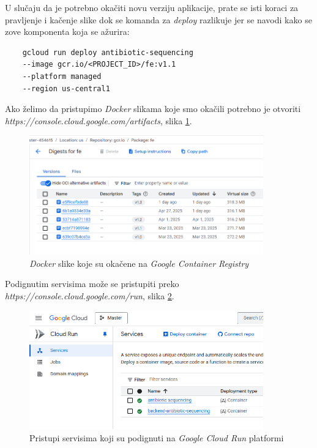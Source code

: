 \documentclass[12pt,oneside]{memoir}
\begin{document}
U slučaju da je potrebno okačiti novu verziju aplikacije, prate se isti koraci za pravljenje i kačenje slike dok se komanda za \emph{deploy} razlikuje jer se navodi kako se zove komponenta koja se ažurira:
\begin{verbatim}
    gcloud run deploy antibiotic-sequencing 
    --image gcr.io/<PROJECT_ID>/fe:v1.1 
    --platform managed 
    --region us-central1
\end{verbatim}

Ako želimo da pristupimo \emph{Docker} slikama koje smo okačili potrebno je otvoriti \emph{https://console.cloud.google.com/artifacts}, slika \ref{fig:gcr_images}.
\begin{figure}[h]
\centering
\includegraphics[width=0.9\textwidth]{images/gcr_images.png}
\caption{\emph{Docker} slike koje su okačene na \emph{Google Container Registry}}
\label{fig:gcr_images}
\end{figure}

Podignutim servisima može se pristupiti preko \emph{https://console.cloud.google.com/run}, slika \ref{fig:gcr_services}.

\begin{figure}[h]
\centering
\includegraphics[width=0.9\textwidth]{images/gcr_services.png}
\caption{Pristupi servisima koji su podignuti na \emph{Google Cloud Run} platformi}
\label{fig:gcr_services}
\end{figure}
\end{document}
